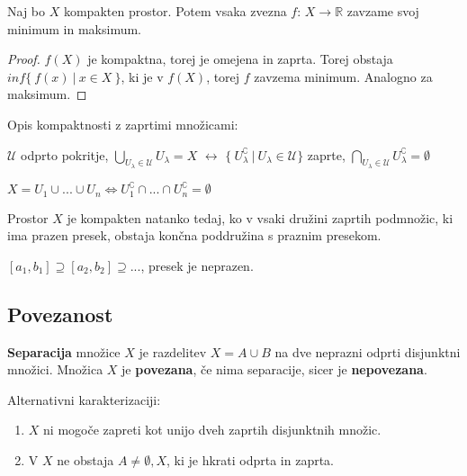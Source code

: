 \documentclass[11pt, a4paper]{article}
\begin{document}
    \begin{corollary}
        Naj bo \(X\) kompakten prostor. Potem vsaka zvezna \(f\): \(X \to \mathbb{R}\) zavzame svoj minimum in maksimum.
    \end{corollary}

    \begin{proof}
        \(f(X)\) je kompaktna, torej je omejena in zaprta. Torej obstaja \(inf \{\ f(x)\ |\ x \in X\ \}\), ki je v \(f(X)\), torej \(f\) zavzema minimum. Analogno za maksimum.
    \end{proof}

    Opis kompaktnosti z zaprtimi množicami:
    \begin{center}
        \(\mathscr{U}\) odprto pokritje, \(\displaystyle \bigcup_{U_\lambda \in \mathscr{U}} U_\lambda = X\) \(\longleftrightarrow\) \(\{\ U_\lambda^\complement\ |\ U_\lambda \in \mathscr{U} \}\) zaprte, \(\displaystyle \bigcap_{U_\lambda \in \mathscr{U}} U_\lambda^\complement = \emptyset\)
    \end{center}
    \begin{center}
        \(X = U_1 \cup ... \cup U_n \Longleftrightarrow U_1^\complement \cap ... \cap U_n^\complement = \emptyset\)
    \end{center}

    \begin{theorem}
        Prostor \(X\) je kompakten natanko tedaj, ko v vsaki družini zaprtih podmnožic, ki ima prazen presek, obstaja končna poddružina s praznim presekom.
    \end{theorem}

    \begin{corollary}
        \([a_1,b_1] \supseteq [a_2,b_2] \supseteq ...\), presek je neprazen.
    \end{corollary}


    \subsection{Povezanost}

    \begin{definition}
        \textbf{Separacija} množice \(X\) je razdelitev \(X = A \cup B\) na dve neprazni odprti disjunktni množici. Množica \(X\) je \textbf{povezana}, če nima separacije, sicer je \textbf{nepovezana}.
    \end{definition}

    Alternativni karakterizaciji:
    \begin{enumerate}[label=(\arabic*)]
        \item \(X\) ni mogoče zapreti kot unijo dveh zaprtih disjunktnih množic.
        \item V \(X\) ne obstaja \(A \neq \emptyset, X\), ki je hkrati odprta in zaprta.
    \end{enumerate}
\end{document}
